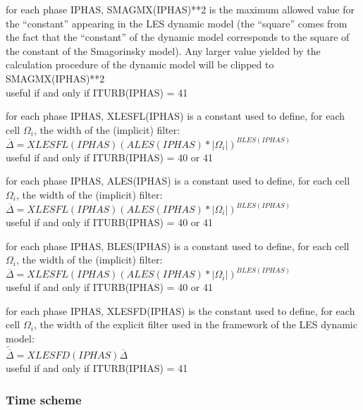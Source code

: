 {for each phase IPHAS, SMAGMX(IPHAS)**2 is
the maximum allowed value for the ``constant'' appearing in the LES dynamic
model (the ``square'' comes from the fact that the
``constant'' of the dynamic model corresponds to the square of the
constant of the Smagorinsky model). Any larger value yielded by the calculation
procedure of the dynamic model will be clipped to SMAGMX(IPHAS)**2\\
useful if and only if ITURB(IPHAS) = 41}

{for each phase IPHAS, XLESFL(IPHAS) is a constant used to define, for
each cell $\Omega_i$, the width of the (implicit) filter:\\
$\overline{\Delta}=XLESFL(IPHAS)(ALES(IPHAS)*|\Omega_i|)^{BLES(IPHAS)}$\\
useful if and only if ITURB(IPHAS) = 40 or 41}

{for each phase IPHAS, ALES(IPHAS) is a constant used to define, for
each cell $\Omega_i$, the width of the (implicit) filter:\\
$\overline{\Delta}=XLESFL(IPHAS)(ALES(IPHAS)*|\Omega_i|)^{BLES(IPHAS)}$\\ 
useful if and only if ITURB(IPHAS) = 40 or 41}

{for each phase IPHAS, BLES(IPHAS) is a constant used to define, for
each cell $\Omega_i$, the width of the (implicit) filter:\\
$\overline{\Delta}=XLESFL(IPHAS)(ALES(IPHAS)*|\Omega_i|)^{BLES(IPHAS)}$\\
useful if and only if ITURB(IPHAS) = 40 or 41}

{for each phase IPHAS, XLESFD(IPHAS) is the constant used to define, for
each cell $\Omega_i$, the width of the explicit filter used in the framework of
the LES dynamic model:\\
$\widetilde{\overline{\Delta}}=XLESFD(IPHAS)\overline{\Delta}$\\ 
useful if and only if ITURB(IPHAS) = 41}



\subsubsection{Time scheme}

